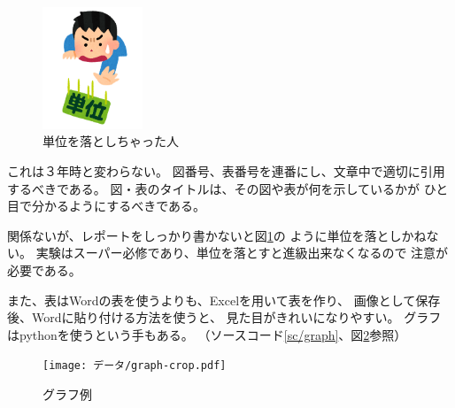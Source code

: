 \documentclass[autodetect-engine,dvipdfmx-if-dvi,ja=standard]{bxjsarticle}
\begin{document}
\begin{figure}
    \vspace{-2\baselineskip}
    \centering
    \includegraphics[width=3cm]{データ/単位を落とす人.png}
    \caption{単位を落としちゃった人}
    \label{img/単位}
    \vspace{-1\baselineskip}
\end{figure}

これは３年時と変わらない。
図番号、表番号を連番にし、文章中で適切に引用するべきである。
図・表のタイトルは、その図や表が何を示しているかが
ひと目で分かるようにするべきである。

関係ないが、レポートをしっかり書かないと図\ref{img/単位}の
ように単位を落としかねない。
実験はスーパー必修であり、単位を落とすと進級出来なくなるので
注意が必要である。

また、表はWordの表を使うよりも、Excelを用いて表を作り、
画像として保存後、Wordに貼り付ける方法を使うと、
見た目がきれいになりやすい。
グラフはpythonを使うという手もある。
（ソースコード\ref{sc/graph}、図\ref{img/graph}参照）





\begin{figure}[h]
	\centering
	\texttt{[image: データ/graph-crop.pdf]}
	\caption{グラフ例}
    \label{img/graph}
    \vspace{-1\baselineskip}
\end{figure}
\end{document}
